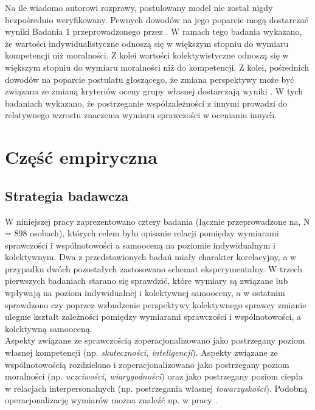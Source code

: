 \documentclass[man]{apa6}
\begin{document}
Na ile wiadomo autorowi rozprawy, postulowany model nie został nigdy bezpośrednio weryfikowany. Pewnych dowodów na jego poparcie mogą dostarczać wyniki Badania 1 przeprowadzonego przez \textcite{wojciszke1997parallels}. W ramach tego badania wykazano, że wartości indywidualistyczne odnoszą się w większym stopniu do wymiaru kompetencji niż moralności. Z kolei wartości kolektywistyczne odnoszą się w większym stopniu do wymiaru moralności niż do kompetencji. Z kolei, pośrednich dowodów na poparcie postulatu głoszącego, że zmiana perspektywy może być związana ze zmianą kryteriów oceny grupy własnej dostarczają wyniki \textcite{wojciszke2008primacy}. W tych badaniach wykazano, że postrzeganie współzależności z innymi prowadzi do relatywnego wzrostu znaczenia wymiaru sprawczości w ocenianiu innych.\\

\newpage
\section{Część empiryczna}

\subsection{Strategia badawcza}

W niniejszej pracy zaprezentowano cztery badania (łącznie przeprowadzone na, N = 898 osobach), których celem było opisanie relacji pomiędzy wymiarami sprawczości i wspólnotowości a samooceną na poziomie indywidualnym i kolektywnym. Dwa z przedstawionych badań miały charakter korelacyjny, a w przypadku dwóch pozostałych zastosowano schemat eksperymentalny. W trzech pierwszych badaniach starano się sprawdzić, które wymiary są związane lub wpływają na poziom indywidualnej i kolektywnej samooceny, a w ostatnim sprawdzono czy poprzez wzbudzenie perspektywy kolektywnego sprawcy zmianie ulegnie kształt zależności pomiędzy wymiarami sprawczości i wspólnotowości, a kolektywną samooceną. \\

Aspekty związane ze sprawczością zoperacjonalizowano jako postrzegany poziom własnej kompetencji (np. \emph{skuteczności, inteligencji}). Aspekty związane ze wspólnotowością rozdzielono i zoperacjonalizowano jako postrzegany poziom moralności (np. \emph{uczciwości, wiarygodności}) oraz jako postrzegany poziom ciepła w relacjach interpersonalnych (np. postrzegania własnej \emph{towarzyskości}). Podobną operacjonalizację wymiarów można znaleźć np. w pracy \textcite{leach2007group}.\\
\end{document}
